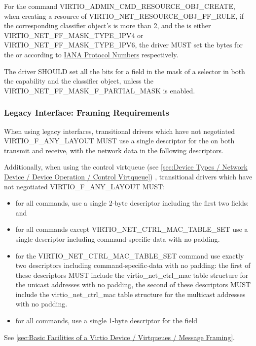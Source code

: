 For the command VIRTIO_ADMIN_CMD_RESOURCE_OBJ_CREATE, when creating a resource of
 VIRTIO_NET_RESOURCE_OBJ_FF_RULE, if the corresponding classifier
object's  is more than 2, and the  is either
VIRTIO_NET_FF_MASK_TYPE_IPV4 or VIRTIO_NET_FF_MASK_TYPE_IPV6, the driver MUST
set the  bytes for the  or 
according to \hyperref[intro:IANA Protocol Numbers]{IANA Protocol Numbers} respectively.

The driver SHOULD set all the bits for a field in the mask of a selector in both the
capability and the classifier object, unless the VIRTIO_NET_FF_MASK_F_PARTIAL_MASK
is enabled.

\subsubsection{Legacy Interface: Framing Requirements}\label{sec:Device
Types / Network Device / Legacy Interface: Framing Requirements}

When using legacy interfaces, transitional drivers which have not
negotiated VIRTIO_F_ANY_LAYOUT MUST use a single descriptor for the
 on both transmit and receive, with the
network data in the following descriptors.

Additionally, when using the control virtqueue (see \ref{sec:Device
Types / Network Device / Device Operation / Control Virtqueue})
, transitional drivers which have not
negotiated VIRTIO_F_ANY_LAYOUT MUST:
\begin{itemize}
\item for all commands, use a single 2-byte descriptor including the first two
fields:  and 
\item for all commands except VIRTIO_NET_CTRL_MAC_TABLE_SET
use a single descriptor including command-specific-data
with no padding.
\item for the VIRTIO_NET_CTRL_MAC_TABLE_SET command use exactly
two descriptors including command-specific-data with no padding:
the first of these descriptors MUST include the
virtio_net_ctrl_mac table structure for the unicast addresses with no padding,
the second of these descriptors MUST include the
virtio_net_ctrl_mac table structure for the multicast addresses
with no padding.
\item for all commands, use a single 1-byte descriptor for the
 field
\end{itemize}

See \ref{sec:Basic
Facilities of a Virtio Device / Virtqueues / Message Framing}.
